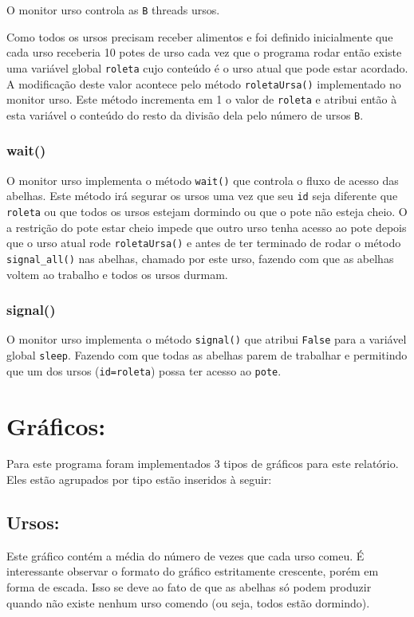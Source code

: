 \documentclass[12pt,a4paper]{article}
\begin{document}
O monitor urso controla as \verb+B+ threads ursos.

Como todos os ursos precisam receber alimentos e foi definido inicialmente que cada urso receberia 10 potes de urso cada vez que o programa rodar então existe uma variável global \verb+roleta+ cujo conteúdo é o urso atual que pode estar acordado. A modificação deste valor acontece pelo método \verb+roletaUrsa()+ implementado no monitor urso. Este método incrementa em 1 o valor de \verb+roleta+ e atribui então à esta variável o conteúdo do resto da divisão dela pelo número de ursos \verb+B+.

\subsubsection{wait()}

O monitor urso implementa o método \verb+wait()+ que controla o fluxo de acesso das abelhas. Este método irá segurar os ursos uma vez que seu \verb+id+ seja diferente que \verb+roleta+ ou que todos os ursos estejam dormindo ou que o pote não esteja cheio. O a restrição do pote estar cheio impede que outro urso tenha acesso ao pote depois que o urso atual rode \verb+roletaUrsa()+ e antes de ter terminado de rodar o método \verb+signal_all()+ nas abelhas, chamado por este urso, fazendo com que as abelhas voltem ao trabalho e todos os ursos durmam.

\subsubsection{signal()}

O monitor urso implementa o método \verb+signal()+ que atribui \verb+False+ para a variável global \verb+sleep+. Fazendo com que todas as abelhas parem de trabalhar e permitindo que um dos ursos (\verb+id=roleta+) possa ter acesso ao \verb+pote+.

\section{Gráficos:}

Para este programa foram implementados 3 tipos de gráficos para este relatório. Eles estão agrupados por tipo estão inseridos à seguir:

\subsection{Ursos:}

Este gráfico contém a média do número de vezes que cada urso comeu. É interessante observar o formato do gráfico estritamente crescente, porém em forma de escada. Isso se deve ao fato de que as abelhas só podem produzir quando não existe nenhum urso comendo (ou seja, todos estão dormindo).
\end{document}
